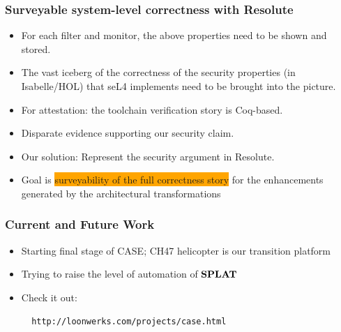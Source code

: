 \documentclass{beamer}
\newcommand{\konst}[1]{\ensuremath{\mbox{\bf{#1}}}}
\begin{document}
\begin{frame}\frametitle{Surveyable system-level correctness with Resolute}

\begin{itemize}
\item For each filter and monitor, the above properties need to be shown and stored.

\item The vast iceberg of the correctness of the security properties
  (in Isabelle/HOL) that seL4 implements need to be brought into the
  picture.

\item For attestation: the toolchain verification story is Coq-based.

\item Disparate evidence supporting our security claim.

\item Our solution: Represent the security argument in Resolute.

\item Goal is \colorbox{orange}{surveyability of the full correctness
  story} for the enhancements generated by the architectural
  transformations

\end{itemize}

\end{frame}


\begin{frame}[fragile]\frametitle{Current and  Future Work}

\begin{itemize}
\item Starting final stage of CASE; CH47 helicopter is our transition platform

\item Trying to raise the level of automation of \konst{SPLAT}

\item Check it out:

\begin{verbatim}
  http://loonwerks.com/projects/case.html
\end{verbatim}

\end{itemize}
\end{frame}
\end{document}
